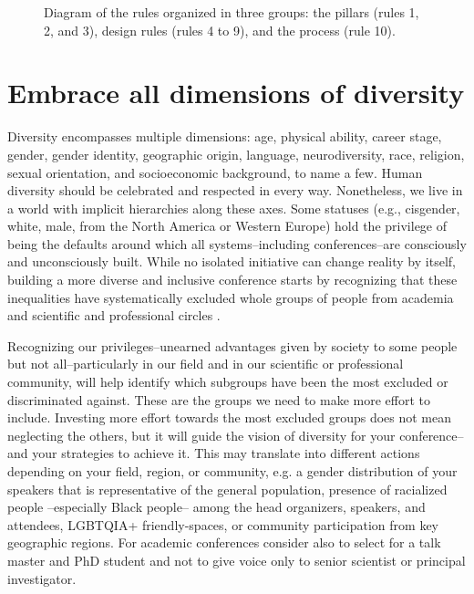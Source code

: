 \documentclass[10pt,letterpaper]{article}
\begin{document}
\begin{figure}[!h]
{}
\caption{Diagram of the rules organized in three groups: the pillars (rules 1, 2, and 3), design rules (rules 4 to 9), and the process (rule 10).}
\label{fig:diagram}
\end{figure}


\section{Embrace all dimensions of diversity}
\label{rule_diversity}

Diversity encompasses multiple dimensions: age, physical ability, career stage, gender, gender identity, geographic origin, language, neurodiversity, race, religion, sexual orientation, and socioeconomic background, to name a few.
Human diversity should be celebrated and respected in every way. Nonetheless, we live in a world with implicit hierarchies along these axes. Some statuses (e.g., cisgender, white, male, from the North America or Western Europe) hold the privilege of being the defaults around which all systems--including conferences--are consciously and unconsciously built. 
While no isolated initiative can change reality by itself, building a more diverse and inclusive conference starts by recognizing that these inequalities have systematically excluded whole groups of people from academia and scientific and professional circles \cite{timperleyHeMoanaPukepuke2020}. 

Recognizing our privileges--unearned advantages given by society to some people but not all--particularly in our field and in our scientific or professional community, will help identify which subgroups have been the most excluded or discriminated against. 
These are the groups we need to make more effort to include.
Investing more effort towards the most excluded groups does not mean neglecting the others, but it will guide the vision of diversity for your conference--and your strategies to achieve it.
This may translate into different actions depending on your field, region, or community, e.g. a gender distribution of your speakers that is representative of the general population, presence of racialized people --especially Black people-- among the head organizers, speakers, and attendees, LGBTQIA+ friendly-spaces, or community participation from key geographic regions. For academic conferences consider also to select for a talk master and PhD student and not to give voice only to senior scientist or principal investigator. 
\end{document}
